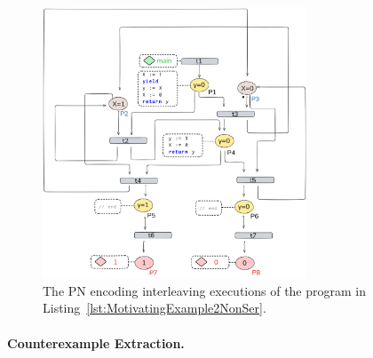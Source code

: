 %


\begin{figure}[!htbp]
	\centering
	\includegraphics[width=0.7\textwidth]{plots/code_2_PN_with_annotation.png}
	\caption{The PN encoding interleaving executions of the program in Listing~\ref{lst:MotivatingExample2NonSer}.}
	\label{fig:code2ExamplePN}
\end{figure}

\paragraph{Counterexample Extraction.}

